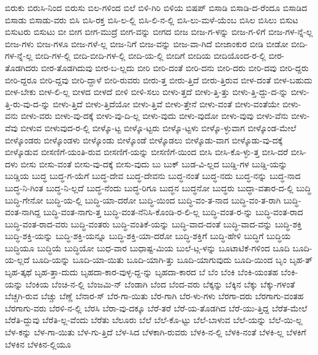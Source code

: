 {ಬಿರುಕು
ಬಿರುಸಿ-ನಿಂದ
ಬಿರುಸು
ಬಿಲ-ಗಳಿಂದ
ಬಿಲೆ
ಬಿಳಿ-ಗಿರಿ
ಬಿಳಿಯ
ಬಿಷಪ್
ಬಿಸಾಡಿ
ಬಿಸಾಡಿ-ದ-ರೆಂದೂ
ಬಿಸಾಡಿದ
ಬಿಸಾಡು
ಬಿಸಾಡು-ವರು
ಬಿಸಿ
ಬಿಸಿ-ರಕ್ತ
ಬಿಸಿ-ಲ-ಲ್ಲಿ
ಬಿಸಿ-ಲಿ-ನ-ಲ್ಲಿ
ಬಿಸಿ-ಲು-ಮಳೆ-ಯೆಂಬ
ಬಿಸಿಲ
ಬಿಸಿಲು
ಬಿಸುಟ
ಬಿಸುಟರು
ಬಿಸುಟು
ಬೀ
ಬೀಗ
ಬೀಗ-ಮುದ್ರೆ
ಬೀಗ-ವನ್ನು
ಬೀಗದ
ಬೀಜ
ಬೀಜ-ಗ-ಳನ್ನು
ಬೀಜ-ಗ-ಳಿಗೆ
ಬೀಜ-ಗಳ-ನ್ನೆ-ಲ್ಲ
ಬೀಜ-ಗಳು
ಬೀಜ-ಗಳೂ
ಬೀಜ-ಗಳೆ-ಲ್ಲ
ಬೀಜ-ನಿಗೆ
ಬೀಜ-ವನ್ನು
ಬೀಜ-ವಾ-ಗಿದೆ
ಬೀಜಾಂಕುರ
ಬೀಡಿ
ಬೀಡೋ
ಬೀದಿ-ಗಳ-ನ್ನೆ-ಲ್ಲ
ಬೀದಿ-ಗಳ-ಲ್ಲಿ
ಬೀದಿ-ಬೀದಿ-ಗಳ-ಲ್ಲಿ
ಬೀದಿ-ಯ-ಲ್ಲಿ
ಬೀದಿಗೆ
ಬೀದಿಯ
ಬೀದಿಯೊಂದ-ರ-ಲ್ಲಿ
ಬೀರ-ತೊಡಗಿದರು
ಬೀರ-ತೊಡಗಿದುವು
ಬೀರ-ಬ-ಲ್ಲದು
ಬೀರಿ
ಬೀರಿ-ದಂತೆ
ಬೀರಿ-ದನು
ಬೀರಿ-ದರು
ಬೀರಿ-ದವು
ಬೀರಿ-ದ್ದರು
ಬೀರಿ-ದ್ದರೂ
ಬೀರಿ-ದ್ದವು
ಬೀರಿ-ದ್ದಾಳೆ
ಬೀರಿ-ರುವರು
ಬೀರು-ತ್ತ
ಬೀರು-ತ್ತಿದೆ
ಬೀರು-ತ್ತಿರುವ
ಬೀಳ-ದಂತೆ
ಬೀಳ-ಬಹುದು
ಬೀಳ-ಬೇಕು
ಬೀಳ-ಲಿ-ಲ್ಲ
ಬೀಳದ
ಬೀಳದೆ
ಬೀಳಿ
ಬೀಳಿ-ಸಲು
ಬೀಳು-ತ್ತದೆ
ಬೀಳು-ತ್ತಿ-ತ್ತು
ಬೀಳು-ತ್ತಿ-ದ್ದು-ದ-ನ್ನು
ಬೀಳು-ತ್ತಿ-ರು-ವು-ದ-ನ್ನು
ಬೀಳು-ತ್ತಿದೆ
ಬೀಳು-ತ್ತಿದೆಯೋ
ಬೀಳು-ತ್ತಿವೆ
ಬೀಳು-ತ್ತೇನೆ
ಬೀಳು-ವಂತೆ
ಬೀಳು-ವಂತೆಯೇ
ಬೀಳು-ವನು
ಬೀಳು-ವರು
ಬೀಳು-ವು-ದಕ್ಕೆ
ಬೀಳು-ವು-ದಿ-ಲ್ಲ
ಬೀಳು-ವುದು
ಬೀಳು-ವುದೋ
ಬೀಳು-ವುವು
ಬೀಳು-ವೆನು
ಬೀಳು-ವೆವು
ಬೀಳುವ
ಬೀಳುವುದ-ರ-ಲ್ಲಿ
ಬೀಳ್ಕೊ-ಟ್ಟ
ಬೀಳ್ಕೊ-ಟ್ಟರು
ಬೀಳ್ಕೊ-ಟ್ಟಳು
ಬೀಳ್ಕೊ-ಳ್ಳುವಾಗ
ಬೀಳ್ಕೊಂಡ-ಮೇಲೆ
ಬೀಳ್ಕೊಂಡರು
ಬೀಳ್ಕೊಂಡಳು
ಬೀಳ್ಕೊಂಡು
ಬೀಳ್ಕೊಂಡೆ
ಬೀಳ್ಕೊಡಲು
ಬೀಳ್ಕೊಡು-ವಾಗ
ಬೀಳ್ಕೊಡು-ವು-ದಕ್ಕೆ
ಬೀಳ್ಕೊಡುವ
ಬೀಸಣಿಗೆ-ಯಂತಿ-ರುವ
ಬೀಸಣಿಗೆ-ಯನ್ನು
ಬೀಸಣಿಗೆ-ಯಿಂದ
ಬೀಸಿ
ಬೀಸಿ-ಕೊ-ಳ್ಳು-ತ್ತ
ಬೀಸಿ-ದರೆ
ಬೀಸಿ-ದಳು
ಬೀಸು
ಬೀಸು-ವಂತೆ
ಬೀಸು-ವು-ದಕ್ಕೆ
ಬೀಸು-ವುದು
ಬು
ಬುಕ್
ಬುಡ-ವಿ-ಲ್ಲದ
ಬುಡ್ಡಿ-ಗಳ
ಬುಡ್ಡಿ-ಯನ್ನು
ಬುಡ್ಡಿಯ
ಬುದ್ಧ
ಬುದ್ಧ-ಗ-ಯೆಗೆ
ಬುದ್ಧ-ದೇವ
ಬುದ್ಧ-ದೇವನು
ಬುದ್ಧ-ನಂತೆ
ಬುದ್ಧ-ನದು
ಬುದ್ಧ-ನನ್ನು
ಬುದ್ಧ-ನಾದ
ಬುದ್ಧ-ನಿ-ಗಿಂತ
ಬುದ್ಧ-ನಿ-ಲ್ಲದೆ
ಬುದ್ಧ-ನೆಂದು
ಬುದ್ಧ-ರಿಗೂ
ಬುದ್ಧನ
ಬುದ್ಧನೋ
ಬುದ್ಧರು
ಬುದ್ಧಾ-ವತಾರ-ದ-ಲ್ಲಿ
ಬುದ್ಧಿ
ಬುದ್ಧಿ-ಗೇನೋ
ಬುದ್ಧಿ-ಯ-ಲ್ಲಿ
ಬುದ್ಧಿ-ಯಾ-ದರೋ
ಬುದ್ಧಿ-ಯಿಂದ
ಬುದ್ಧಿ-ವಂ-ತ-ನಾದ
ಬುದ್ಧಿ-ವಂ-ತ-ರಾಗಿ
ಬುದ್ಧಿ-ವಂತ-ನಾಗಿದ್ದ
ಬುದ್ಧಿ-ವಂತ-ನಾಗು-ತ್ತ
ಬುದ್ಧಿ-ವಂತ-ನೆನಿಸಿ-ಕೊಂಡಿ-ರ-ಲಿ-ಲ್ಲ
ಬುದ್ಧಿ-ವಂತ-ರ-ನ್ನು
ಬುದ್ಧಿ-ವಂತ-ರಾದ
ಬುದ್ಧಿ-ವಂತ-ರಾದ-ವರು
ಬುದ್ಧಿ-ವಂತರು
ಬುದ್ಧಿ-ವಂತಿಕೆ-ಯನ್ನು
ಬುದ್ಧಿ-ವಾದ-ದಂತೆ
ಬುದ್ಧಿ-ವಾದ-ವನ್ನು
ಬುದ್ಧಿ-ಶಕ್ತಿ
ಬುದ್ಧಿ-ಶಕ್ತಿ-ಯನ್ನು
ಬುದ್ಧಿ-ಶಕ್ತಿ-ಯನ್ನೂ
ಬುದ್ಧಿ-ಶಕ್ತಿ-ಯಾ-ದರೋ
ಬುದ್ಧಿ-ಶಕ್ತಿಗೆ
ಬುದ್ಧಿ-ಹೇಳಿ
ಬುದ್ಧಿಗೆ
ಬುದ್ಧಿಯ
ಬುದ್ಧಿಯೂ
ಬುದ್ಧಿಯೆ
ಬುದ್ಧಿಯೋ
ಬುಧ-ವಾರ
ಬುಧಾಷ್ಟ-ಮಿಯ
ಬುಲೆ-ಟ್ಗ-ಳನ್ನು
ಬೂಟಾಟಿಕೆ-ಗಳಿಂದ
ಬೂದಿ
ಬೂದಿ-ಯ-ಲ್ಲದೆ
ಬೂದಿ-ಯನ್ನು
ಬೂದಿ-ಯಾ-ಯಿತು
ಬೂದಿ-ಯಾಗಿ-ತ್ತು
ಬೂದಿ-ಯಾಗುವುದು
ಬೂದಿ-ಯಿಂದ
ಬೃಂ
ಬೃಹ-ತ್
ಬೃಹ-ತ್ಕಥೆ
ಬೃಹ-ತ್ತಾ-ದುದು
ಬೃಹದಾ-ಕಾರ-ವುಳ್ಳ-ದ್ದ-ನ್ನು
ಬೃಹದಾ-ಕಾರದ
ಬೆ
ಬೆಂ
ಬೆಂಕಿ
ಬೆಂಕಿ-ಯಂತಹ
ಬೆಂಕಿ-ಯನ್ನು
ಬೆಂಕಿಯ
ಬೆಂಚಿ-ನ-ಲ್ಲಿ
ಬೆಂಜಮಿ-ನ್
ಬೆಂಡಾಗಿ
ಬೆಂದ
ಬೆಂದ-ವರು
ಬೆಕ್ಕನ್ನು
ಬೆಕ್ಕಿನ
ಬೆಕ್ಕು
ಬೆಕ್ಕು-ಗಳಂತೆ
ಬೆಚ್ಚಗಿ-ರುವ
ಬೆಚ್ಚು
ಬೆಣ್ಣೆ
ಬೆನಾರ-ಸ್
ಬೆರ-ಗಾ-ಯಿತು
ಬೆರ-ಗಾಗಿ
ಬೆರ-ಳು-ಗಳು
ಬೆರಗಾ-ದರು
ಬೆರಗಾಗು-ವಂತಹ
ಬೆರಗಾಗು-ವರು
ಬೆರಳಿ-ನ-ಲ್ಲಿ
ಬೆರಸಿ
ಬೆರಾ-ವು-ದಕ್ಕೂ
ಬೆರೆ-ತರೆ
ಬೆರೆ-ಯ-ತೊಡಗಿದ
ಬೆರೆ-ಯು-ತ್ತಿದ್ದ
ಬೆರೆತ-ಮೇಲೆ
ಬೆರೆತಿ-ದ್ದುವು
ಬೆರೆತಿ-ಲ್ಲ-ವೆಂದು
ಬೆರೆತು
ಬೆಲೂರು
ಬೆಲೆ
ಬೆಲೆ-ಕೊ-ಟ್ಟು
ಬೆಲೆ-ಬಾಳುವ
ಬೆಲೆ-ಯನ್ನು
ಬೆಲೆ-ಯಿ-ಲ್ಲ
ಬೆಳ-ಕನ್ನು
ಬೆಳ-ಗಾ-ಯಿತು
ಬೆಳ-ಗು-ತ್ತಿದೆ
ಬೆಳ-ಸಿದ
ಬೆಳಕಾಗಿ-ರುವರು
ಬೆಳಕಿ-ನ-ಲ್ಲಿ
ಬೆಳಕಿ-ನಂತೆ
ಬೆಳಕಿ-ಲ್ಲ
ಬೆಳಕಿಗೆ
ಬೆಳಕಿನ
ಬೆಳಕಿನ-ಲ್ಲಿಯೂ
}
